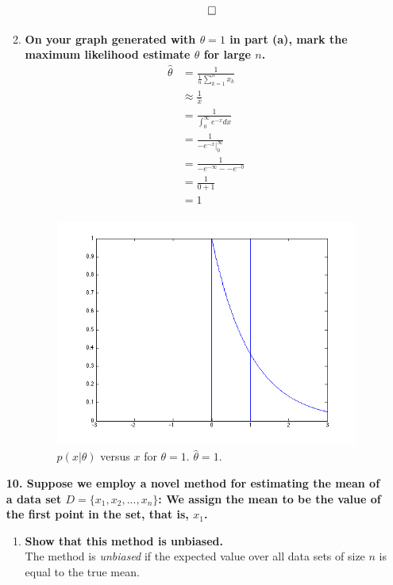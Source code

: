 \documentclass[12pt]{article}
\begin{document}
\begin{enumerate}
\begin{enumerate}
\begin{equation}
\begin{split}
      & \qed
    \end{split}
    \end{equation}
  \item \textbf{On your graph generated with $\theta = 1$ in part (a), mark the maximum likelihood estimate $\hat{\theta}$ for large $n$.}
    \begin{equation}
    \begin{split}
      \hat{\theta}& = \frac{1}{\frac{1}{n}\sum_{k=1}^nx_k} \\
      & \approx \frac{1}{\bar{x}} \\
      & = \frac{1}{\int_0^\infty e^{-x} dx} \\
      & = \frac{1}{-e^{-x}|_0^\infty} \\
      & = \frac{1}{-e^{-\infty} - -e^{-0}} \\
      & = \frac{1}{0 + 1} \\
      & = 1 \\
    \end{split}
    \end{equation}
    \begin{figure}[H]
      \centering
      \includegraphics[width=4in]{1c}
      \caption{$p(x|\theta)$ versus $x$ for $\theta = 1$. $\hat{\theta} = 1$.}
    \end{figure}
  \end{enumerate}
  \subitem \textbf{10. Suppose we employ a novel method for estimating the mean of a data set $D = \{x_1,x_2,...,x_n\}$: We assign the mean to be the value of the first point in the set, that is, $x_1$.}
  \begin{enumerate}
  \item \textbf{Show that this method is unbiased.} \\
    The method is \emph{unbiased} if the expected value over all data sets of size $n$ is equal to the true mean.

\end{enumerate}
\end{enumerate}
\end{document}
